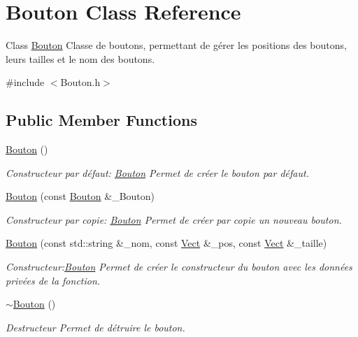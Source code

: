 \hypertarget{classBouton}{}\section{Bouton Class Reference}
\label{classBouton}


Class \hyperlink{classBouton}{Bouton} Classe de boutons, permettant de gérer les positions des boutons, leurs tailles et le nom des boutons.  




{\ttfamily \#include $<$Bouton.\+h$>$}

\subsection*{Public Member Functions}
\begin{DoxyCompactItemize}
\item 
\hyperlink{classBouton_ad1e4f684cad81db47393df0be7a65658}{Bouton} ()
\begin{DoxyCompactList}\small\item\em Constructeur par défaut\+: \hyperlink{classBouton}{Bouton} Permet de créer le bouton par défaut. \end{DoxyCompactList}\item 
\hyperlink{classBouton_adbbccfea61e26714d2271f1ce097b353}{Bouton} (const \hyperlink{classBouton}{Bouton} \&\+\_\+\+Bouton)
\begin{DoxyCompactList}\small\item\em Constructeur par copie\+: \hyperlink{classBouton}{Bouton} Permet de créer par copie un nouveau bouton. \end{DoxyCompactList}\item 
\hyperlink{classBouton_aeb26a7a212241ab7ce4de225e72c856d}{Bouton} (const std\+::string \&\+\_\+nom, const \hyperlink{classVect}{Vect} \&\+\_\+pos, const \hyperlink{classVect}{Vect} \&\+\_\+taille)
\begin{DoxyCompactList}\small\item\em Constructeur\+:\hyperlink{classBouton}{Bouton} Permet de créer le constructeur du bouton avec les données privées de la fonction. \end{DoxyCompactList}\item 
\mbox{\label{classBouton_a0976697439f9e96911b4c399d1a69b4b}} 
\hyperlink{classBouton_a0976697439f9e96911b4c399d1a69b4b}{$\sim$\+Bouton} ()
\begin{DoxyCompactList}\small\item\em Destructeur Permet de détruire le bouton. \end{DoxyCompactList}\item 

\end{DoxyCompactItemize}
